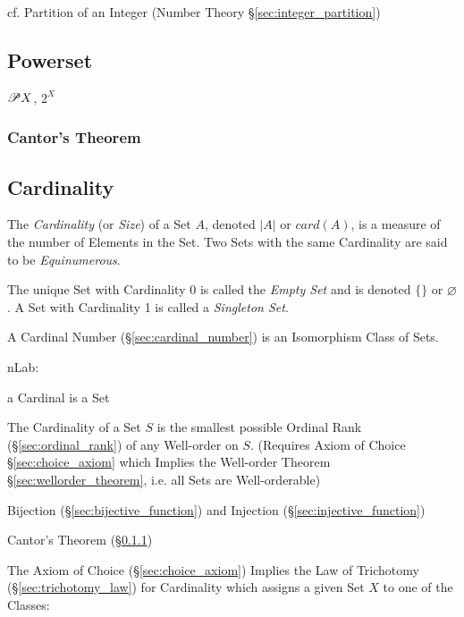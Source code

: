 cf. Partition of an Integer (Number Theory \S\ref{sec:integer_partition})



\subsection{Powerset}\label{sec:powerset}

$\mathscr{P}{X}$, $2^X$

\subsubsection{Cantor's Theorem}\label{sec:cantors_theorem}



\subsection{Cardinality}\label{sec:cardinality}

The \emph{Cardinality} (or \emph{Size}) of a Set $A$, denoted $|A|$ or
$card(A)$, is a measure of the number of Elements in the Set. Two Sets
with the same Cardinality are said to be \emph{Equinumerous}.

The unique Set with Cardinality 0 is called the \emph{Empty Set} and
is denoted $\{\}$ or $\varnothing$. A Set with Cardinality 1 is called a
\emph{Singleton Set}.

A Cardinal Number (\S\ref{sec:cardinal_number}) is an Isomorphism
Class of Sets.

nLab:

a Cardinal is a Set

The Cardinality of a Set $S$ is the smallest possible Ordinal Rank
(\S\ref{sec:ordinal_rank}) of any Well-order on $S$. (Requires Axiom
of Choice \S\ref{sec:choice_axiom} which Implies the Well-order
Theorem \S\ref{sec:wellorder_theorem}, i.e. all Sets are
Well-orderable)

Bijection (\S\ref{sec:bijective_function}) and Injection
(\S\ref{sec:injective_function})

Cantor's Theorem (\S\ref{sec:cantors_theorem})

The Axiom of Choice (\S\ref{sec:choice_axiom}) Implies the Law of
Trichotomy (\S\ref{sec:trichotomy_law}) for Cardinality which assigns
a given Set $X$ to one of the Classes:

